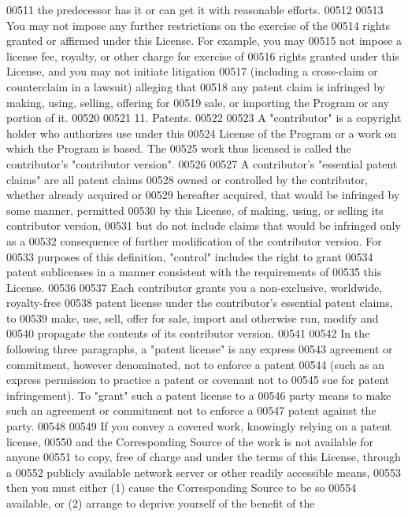 \begin{DoxyCode}
00511 the predecessor has it or can get it with reasonable efforts.
00512 
00513   You may not impose any further restrictions on the exercise of the
00514 rights granted or affirmed under this License.  For example, you may
00515 not impose a license fee, royalty, or other charge for exercise of
00516 rights granted under this License, and you may not initiate litigation
00517 (including a cross-claim or counterclaim in a lawsuit) alleging that
00518 any patent claim is infringed by making, using, selling, offering for
00519 sale, or importing the Program or any portion of it.
00520 
00521   11. Patents.
00522 
00523   A "contributor" is a copyright holder who authorizes use under this
00524 License of the Program or a work on which the Program is based.  The
00525 work thus licensed is called the contributor's "contributor version".
00526 
00527   A contributor's "essential patent claims" are all patent claims
00528 owned or controlled by the contributor, whether already acquired or
00529 hereafter acquired, that would be infringed by some manner, permitted
00530 by this License, of making, using, or selling its contributor version,
00531 but do not include claims that would be infringed only as a
00532 consequence of further modification of the contributor version.  For
00533 purposes of this definition, "control" includes the right to grant
00534 patent sublicenses in a manner consistent with the requirements of
00535 this License.
00536 
00537   Each contributor grants you a non-exclusive, worldwide, royalty-free
00538 patent license under the contributor's essential patent claims, to
00539 make, use, sell, offer for sale, import and otherwise run, modify and
00540 propagate the contents of its contributor version.
00541 
00542   In the following three paragraphs, a "patent license" is any express
00543 agreement or commitment, however denominated, not to enforce a patent
00544 (such as an express permission to practice a patent or covenant not to
00545 sue for patent infringement).  To "grant" such a patent license to a
00546 party means to make such an agreement or commitment not to enforce a
00547 patent against the party.
00548 
00549   If you convey a covered work, knowingly relying on a patent license,
00550 and the Corresponding Source of the work is not available for anyone
00551 to copy, free of charge and under the terms of this License, through a
00552 publicly available network server or other readily accessible means,
00553 then you must either (1) cause the Corresponding Source to be so
00554 available, or (2) arrange to deprive yourself of the benefit of the

\end{DoxyCode}
